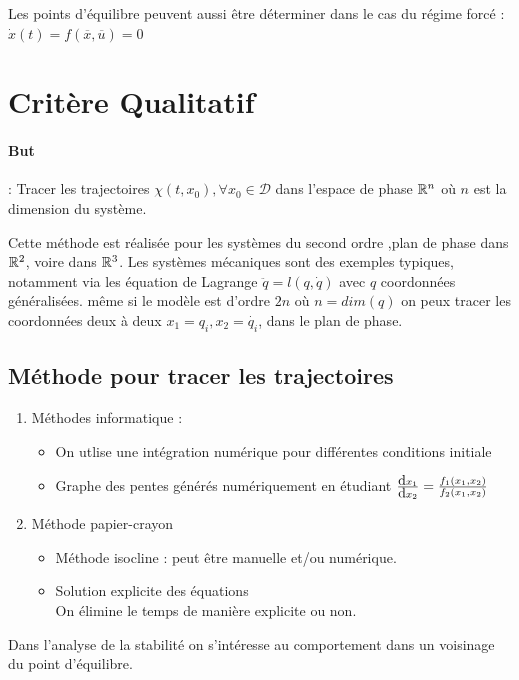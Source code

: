 \documentclass[main.tex]{subfiles}
\newcommand{\D}{\mathcal{D}}
\begin{document}
\begin{rem}
  Les points d'équilibre peuvent aussi être déterminer dans le cas du régime forcé : $\dot{x}(t) = f(\overline{x},\overline{u}) = 0$
\end{rem}

\section{Critère Qualitatif}

\paragraph{But}: Tracer les trajectoires $\chi(t,x_0),\forall x_0\in \D$ dans l'espace de phase $\R^n$ où $n$ est la dimension du système.

Cette méthode est réalisée pour les systèmes du second ordre ,plan de phase dans $\R^2$, voire dans $\R^3$. Les systèmes mécaniques sont des exemples typiques, notamment via les équation de Lagrange $\ddot{q} =l(q,\dot{q})$ avec $q$ coordonnées généralisées. même si le modèle est d'ordre $2n$ où $n = dim(q)$ on peux tracer les coordonnées deux à deux $x_1= q_i ,x_2 = \dot{q_i}$, dans le plan de phase.

\subsection{Méthode pour tracer les trajectoires}
\begin{enumerate}
\item Méthodes informatique :
  \begin{itemize}
  \item   On utlise une intégration numérique pour différentes conditions initiale
  \item Graphe des pentes générés numériquement en étudiant $\deriv[x_1]{x_2} = \frac{f_1(x_1,x_2)}{f_2(x_1,x_2)}$
  \end{itemize}
\item Méthode papier-crayon
  \begin{itemize}
  \item Méthode isocline : peut être manuelle et/ou numérique.
  \item Solution explicite des équations\\
    On élimine le temps de manière explicite ou non.
  \end{itemize}
\end{enumerate}
Dans l'analyse de la stabilité on s'intéresse au comportement dans un voisinage du point d'équilibre.
\end{document}

